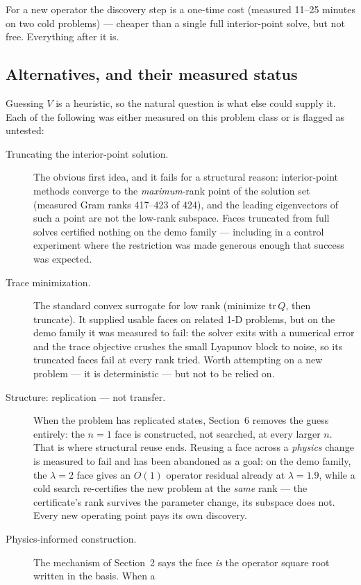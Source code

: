 \documentclass[11pt]{article}
\newcommand{\tr}{\mathrm{tr}}
\begin{document}
For a new operator the discovery step is a one-time cost (measured 11--25
minutes on two cold problems) --- cheaper than a single full interior-point
solve, but not free. Everything after it is.

\subsection*{Alternatives, and their measured status}

Guessing $V$ is a heuristic, so the natural question is what else could
supply it. Each of the following was either measured on this problem class or
is flagged as untested:
\begin{description}
\item[Truncating the interior-point solution.] The obvious first idea, and
  it fails for a structural reason: interior-point methods converge to the
  \emph{maximum}-rank point of the solution set (measured Gram ranks
  417--423 of 424), and the leading eigenvectors of such a point are not the
  low-rank subspace. Faces truncated from full solves certified nothing on
  the demo family --- including in a control experiment where the restriction
  was made generous enough that success was expected.
\item[Trace minimization.] The standard convex surrogate for low rank
  (minimize $\tr\,Q$, then truncate). It supplied usable faces on related
  1-D problems, but on the demo family it was measured to fail: the solver
  exits with a numerical error and the trace objective crushes the small
  Lyapunov block to noise, so its truncated faces fail at every rank tried.
  Worth attempting on a new problem --- it is deterministic --- but not to be
  relied on.
\item[Structure: replication --- not transfer.] When the problem has
  replicated states, Section~6 removes the guess entirely: the $n=1$ face is
  constructed, not searched, at every larger $n$. That is where structural
  reuse ends. Reusing a face across a \emph{physics} change is measured to
  fail and has been abandoned as a goal: on the demo family, the
  $\lambda=2$ face gives an $O(1)$ operator residual already at
  $\lambda=1.9$, while a cold search re-certifies the new problem at the
  \emph{same} rank --- the certificate's rank survives the parameter change,
  its subspace does not. Every new operating point pays its own discovery.
\item[Physics-informed construction.] The mechanism of Section~2 says the
  face \emph{is} the operator square root written in the basis. When a

\end{description}
\end{document}
